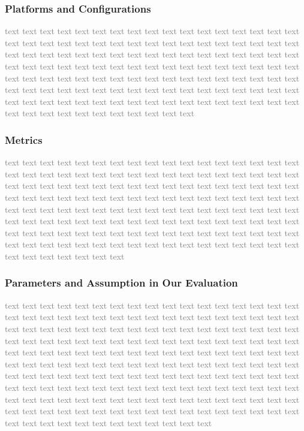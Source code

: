 \documentclass[sigconf]{acmart}
\begin{document}
\subsubsection{Platforms and Configurations}
\textcolor{gray}{
    text text text text text text text text text text text text text text text text text text text text text text text text text text text text text text text text text text text text text text text text text text text text text text text text text text text text text text text text text text text text text text text text text text text text text text text text text text text text text text text text text text text text text text text text text text text text text text text text text text text text text text text text text text text text text text text text text text text text text text text text text text text text text text text text text text
}

\subsubsection{Metrics}
\textcolor{gray}{
    text text text text text text text text text text text text text text text text text text text text text text text text text text text text text text text text text text text text text text text text text text text text text text text text text text text text text text text text text text text text text text text text text text text text text text text text text text text text text text text text text text text text text text text text text text text text text text text text text text text text text text text text text text text text text text text text text text text text text text text text text text text text text text text text text text text text text text text text text text text text text text text
}
\subsubsection{Parameters and Assumption in Our Evaluation}
\textcolor{gray}{
    text text text text text text text text text text text text text text text text text text text text text text text text text text text text text text text text text text text text text text text text text text text text text text text text text text text text text text text text text text text text text text text text text text text text text text text text text text text text text text text text text text text text text text text text text text text text text text text text text text text text text text text text text text text text text text text text text text text text text text text text text text text text text text text text text text text text text text text text text text text text text text text text text text text text text text text text text text text text text text text text text text text text text text text text text text text text text text text text text text text text text text
}
\end{document}
